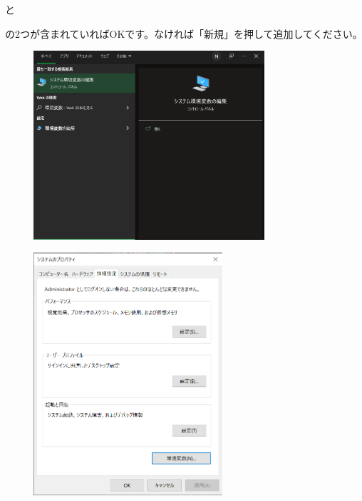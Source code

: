 \begin{quote}
\begin{verbatim*}
\end{verbatim*}
\end{quote}
と
\begin{quote}
\begin{verbatim*}
\end{verbatim*}
\end{quote}
の2つが含まれていればOKです。なければ「新規」を押して追加してください。
\begin{figure}[H]
    \centering
    \includegraphics[height=70mm]{img/path1.png}
    \caption{}
    \label{fig:path1}
\end{figure}
\begin{figure}[H]
    \centering
    \includegraphics[height=90mm]{img/path2.png}
    \caption{}
    \label{fig:path2}
\end{figure}
